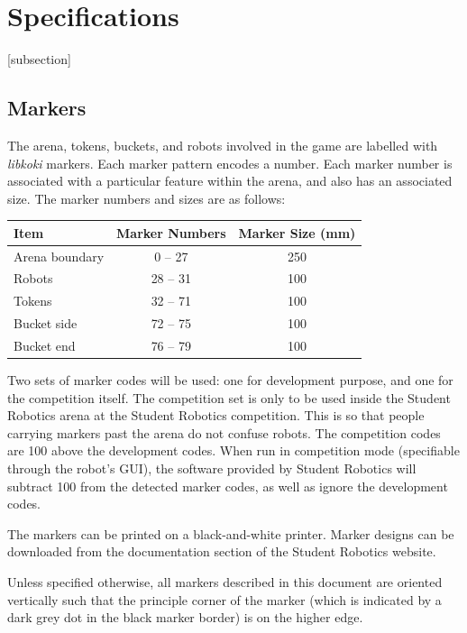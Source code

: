 \section{Specifications}
\label{sec:Specifications}

[subsection]
\newcommand{\rcnii}{\stepcounter{rulei}\arabic{section}.\arabic{subsection}.\arabic{rulei}}
\renewcommand{\labelenumi}{\rcnii}

\subsection{Markers}
\label{sub:markers}
The arena, tokens, buckets, and robots involved in the game are labelled with \textit{libkoki} markers.
Each marker pattern encodes a number.
Each marker number is associated with a particular feature within the arena, and also has an associated size.
The marker numbers and sizes are as follows:

\begin{center}
  \begin{tabular}{lcc}
    \toprule
    \textbf{Item} & \textbf{Marker Numbers} & \textbf{Marker Size (mm)} \\
    \midrule
    Arena boundary & 0 -- 27 & 250 \\
    Robots & 28 -- 31 & 100 \\
    Tokens & 32 -- 71 & 100 \\
    Bucket side & 72 -- 75 & 100 \\
    Bucket end & 76 -- 79 & 100 \\
    \bottomrule
  \end{tabular}
\end{center}

Two sets of marker codes will be used: one for development purpose, and one for the competition itself.
The competition set is only to be used inside the Student Robotics arena at the Student Robotics competition.
This is so that people carrying markers past the arena do not confuse robots.
The competition codes are 100 above the development codes.
When run in competition mode (specifiable through the robot's GUI), the software provided by Student Robotics will subtract 100 from the detected marker codes, as well as ignore the development codes.

The markers can be printed on a black-and-white printer.
Marker designs can be downloaded from the documentation section of the Student Robotics website.

Unless specified otherwise, all markers described in this document are oriented vertically such that the principle corner of the marker (which is indicated by a dark grey dot in the black marker border) is on the higher edge.

